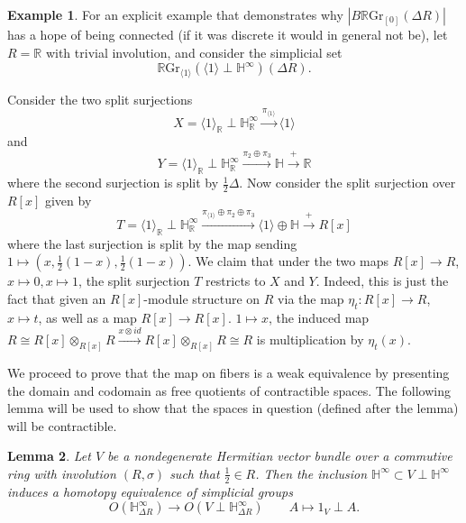 \documentclass[edeposit,fullpage]{uiucthesis2009}
\newcommand{\mbb}{\mathbb}
\newcommand{\RGr}{\mathbb R\mathrm{Gr}}
\theoremstyle{plain}
\newtheorem{lemma}{Lemma}
\numberwithin{lemma}{section}
\theoremstyle{definition}
\newtheorem{example}[lemma]{Example}
\begin{document}
\begin{example}
For an
explicit example that demonstrates why $|B\RGr_{[0]}(\Delta
R)|$ has a hope of being connected (if it was discrete it would in
general not be), let $R = \mbb R$ with trivial involution, and
consider the simplicial set
\[
\RGr_{\langle 1 \rangle}(\langle 1 \rangle \perp \mbb H^\infty)(\Delta R).
\]

Consider the two split surjections
\[
X = \langle 1 \rangle_{\mbb R} \perp \mbb H_{\mbb R}^\infty
\xrightarrow{\pi_{\langle 1 \rangle}} \langle 1 \rangle
\]
and
\[
Y = \langle 1 \rangle_{\mbb R} \perp \mbb H_{\mbb R}^\infty
\xrightarrow{\pi_2 \oplus \pi_3} \mbb H \xrightarrow{+} \mbb R
\]
where the second surjection is split by $\frac{1}{2}\Delta$. 
Now consider the split surjection over $R[x]$ given by
\[
T = \langle 1 \rangle_{\mbb R} \perp \mbb H_{\mbb R}^\infty
\xrightarrow{\pi_{\langle 1 \rangle} \oplus \pi_2 \oplus \pi_3}
\langle 1 \rangle \oplus \mbb H \xrightarrow{+} R[x]
\]
where the last surjection is split by the map sending $1 \mapsto
(x,\frac{1}{2}(1-x),\frac{1}{2}(1-x))$. We claim
that under the two maps $R[x] \rightarrow R$, $x \mapsto 0, x \mapsto
1$, the split surjection $T$ restricts to $X$ and $Y$. Indeed, this is
just the fact that given an $R[x]$-module structure on $R$ via the map
$\eta_t: R[x] \rightarrow R$, $x \mapsto t$, as well as a map $R[x]
\rightarrow R[x]$. $1 \mapsto x$, 
the induced map $R \cong R[x]\otimes_{R[x]} R \xrightarrow{x \otimes id} R[x] \otimes_{R[x]}
R \cong R$ is multiplication by $\eta_t(x)$.
\end{example}

We proceed to prove that the map on fibers is a weak equivalence by
presenting the domain and codomain as free quotients of contractible
spaces. The following lemma will be used to show that the spaces in
question (defined after the lemma) will be contractible. 


\begin{lemma}\label{lem:incHE}
Let $V$ be a nondegenerate Hermitian vector bundle over a commutive
ring with involution $(R,\sigma)$ such that $\frac{1}{2} \in R$. Then
the inclusion $\mbb H^\infty \subset V \perp \mbb H^\infty$ induces a
homotopy equivalence of simplicial groups
\[
O(\mbb H^\infty_{\Delta R}) \rightarrow O(V \perp \mbb
H^\infty_{\Delta R}) \qquad A \mapsto 1_V \perp A.
\]
\end{lemma}
\end{document}
